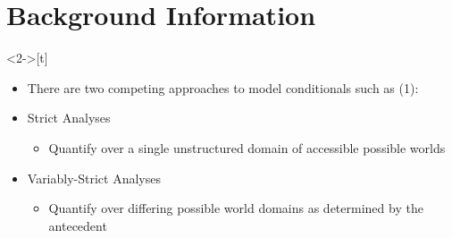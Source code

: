 \section{Background Information}
\begin{frame}<2->[t]
\sectionpage\vskip 9pt

\begin{itemize}
    \item<1-> There are two competing approaches to model conditionals such as (1):
\end{itemize}\vskip 9pt
        \begin{itemize}
            \item<3-> Strict Analyses \citep{Peirce1896,Lewis1912,Lewis1914,Lewis1918,Fintel2001,Gillies2007}\vskip 9pt
                \begin{itemize}
                    \item<4-> Quantify over a single unstructured domain of accessible possible worlds
                \end{itemize}\vskip 18pt
            \item<3-> Variably-Strict Analyses \citep{Stalnaker1968,Lewis1973}\vskip 9pt
                \begin{itemize}
                    \item<5-> Quantify over differing possible world domains as determined by the antecedent 
                \end{itemize}
\end{itemize}
\end{frame}


